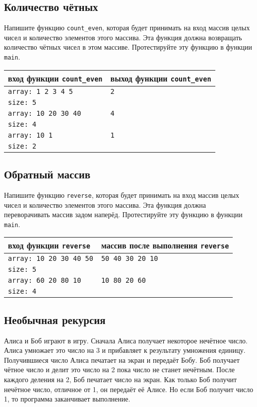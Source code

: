 \documentclass[10pt]{article}
\begin{document}
\subsection{Количество чётных}
Напишите функцию \texttt{count\_even}, которая будет принимать на вход массив целых чисел и количество элементов этого массива. Эта функция должна возвращать количество чётных чисел в этом массиве. Протестируйте эту функцию в функции \texttt{main}.
\begin{center}
\begin{tabular}{ l | l }
 вход функции \texttt{count\_even} & выход функции \texttt{count\_even} \\ \hline
 \texttt{array: 1 2 3 4 5} & \texttt{2} \\
 \texttt{size: 5} & \\ \hline
 \texttt{array: 10 20 30 40} & \texttt{4} \\
 \texttt{size: 4} & \\ \hline
 \texttt{array: 10 1} & \texttt{1} \\
 \texttt{size: 2} & \\
\end{tabular}
\end{center} 
 




\subsection{Обратный массив}
Напишите функцию \texttt{reverse}, которая будет принимать на вход массив целых чисел и количество элементов этого массива. Эта функция должна переворачивать массив задом наперёд. Протестируйте эту функцию в функции \texttt{main}.
\begin{center}
\begin{tabular}{ l | l }
 вход функции \texttt{reverse} & массив после выполнения \texttt{reverse} \\ \hline
 \texttt{array: 10 20 30 40 50} & \texttt{50 40 30 20 10} \\
 \texttt{size: 5} & \\ \hline
 \texttt{array: 60 20 80 10} & \texttt{10 80 20 60} \\
 \texttt{size: 4} & \\
\end{tabular}
\end{center} 




\subsection{Необычная рекурсия}
Алиса и Боб играют в игру. Сначала Алиса получает некоторое нечётное число. Алиса умножает это число на 3 и прибавляет к результату умножения единицу. Получившиеся число Алиса печатает на экран и передаёт Бобу. Боб получает чётное число и делит это число на 2 пока число не станет нечётным. После каждого деления на 2, Боб печатает число на экран. Как только Боб получит нечётное число, отличное от 1, он передаёт её Алисе. Но если Боб получит число 1, то программа заканчивает выполнение.
\end{document}
